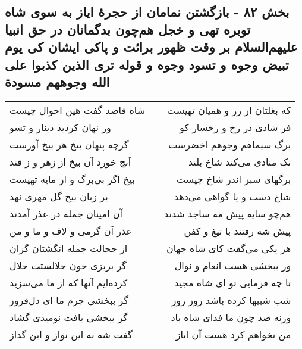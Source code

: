 \begin{center}
\section*{بخش ۸۲ - بازگشتن نمامان از حجرهٔ ایاز به سوی شاه توبره تهی و خجل هم‌چون بدگمانان در حق انبیا علیهم‌السلام بر وقت ظهور برائت و پاکی ایشان کی یوم تبیض وجوه و تسود وجوه و قوله تری الذین کذبوا علی الله وجوههم مسودة}
\label{sec:sh082}
\begin{longtable}{l p{0.5cm} r}
شاه قاصد گفت هین احوال چیست
&&
که بغلتان از زر و همیان تهیست
\\
ور نهان کردید دینار و تسو
&&
فر شادی در رخ و رخسار کو
\\
گرچه پنهان بیخ هر بیخ آورست
&&
برگ سیماهم وجوهم اخضرست
\\
آنچ خورد آن بیخ از زهر و ز قند
&&
نک منادی می‌کند شاخ بلند
\\
بیخ اگر بی‌برگ و از مایه تهیست
&&
برگهای سبز اندر شاخ چیست
\\
بر زبان بیخ گل مهری نهد
&&
شاخ دست و پا گواهی می‌دهد
\\
آن امینان جمله در عذر آمدند
&&
هم‌چو سایه پیش مه ساجد شدند
\\
عذر آن گرمی و لاف و ما و من
&&
پیش شه رفتند با تیغ و کفن
\\
از خجالت جمله انگشتان گزان
&&
هر یکی می‌گفت کای شاه جهان
\\
گر بریزی خون حلالستت حلال
&&
ور ببخشی هست انعام و نوال
\\
کرده‌ایم آنها که از ما می‌سزید
&&
تا چه فرمایی تو ای شاه مجید
\\
گر ببخشی جرم ما ای دل‌فروز
&&
شب شبیها کرده باشد روز روز
\\
گر ببخشی یافت نومیدی گشاد
&&
ورنه صد چون ما فدای شاه باد
\\
گفت شه نه این نواز و این گداز
&&
من نخواهم کرد هست آن ایاز
\\
\end{longtable}
\end{center}
